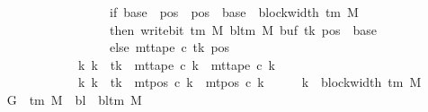 \begin{isabellebody}
\ \ \ \ \ \ \ \ \ \ \ \ \ \ \ \ \ \ \ \ if\ base\ {\isasymle}\ pos\ {\isasymand}\ pos\ {\isacharless}{\kern0pt}\ base\ {\isacharplus}{\kern0pt}\ {\isacharparenleft}{\kern0pt}block{\isacharunderscore}{\kern0pt}width\ {\isacharparenleft}{\kern0pt}{\isasymGamma}{\isacharunderscore}{\kern0pt}tm\ M{\isacharparenright}{\kern0pt}\ {\isacharminus}{\kern0pt}\ {}{\isacharparenright}{\kern0pt}\isanewline
\ \ \ \ \ \ \ \ \ \ \ \ \ \ \ \ \ \ \ \ then\ write{\isacharunderscore}{\kern0pt}bit\ {\isacharparenleft}{\kern0pt}{\isasymGamma}{\isacharunderscore}{\kern0pt}tm\ M{\isacharparenright}{\kern0pt}\ {\isacharparenleft}{\kern0pt}bl{\isacharunderscore}{\kern0pt}tm\ M{\isacharparenright}{\kern0pt}\ {\isacharparenleft}{\kern0pt}buf\ tk{\isacharparenright}{\kern0pt}\ {\isacharparenleft}{\kern0pt}pos\ {\isacharminus}{\kern0pt}\ base{\isacharparenright}{\kern0pt}\isanewline
\ \ \ \ \ \ \ \ \ \ \ \ \ \ \ \ \ \ \ \ else\ mt{\isacharunderscore}{\kern0pt}tape\ c{}\ tk\ pos{\isacharparenright}{\kern0pt}\isanewline
\ \ \ \ \ \ \ \ \ \ \ \ \ \ {\isasymand}\ {\isacharparenleft}{\kern0pt}{\isasymforall}k{\isacharprime}{\kern0pt}{\isachardot}{\kern0pt}\ k{\isacharprime}{\kern0pt}\ {\isasymnoteq}\ tk\ {\isasymlongrightarrow}\ mt{\isacharunderscore}{\kern0pt}tape\ c{\isacharprime}{\kern0pt}\ k{\isacharprime}{\kern0pt}\ {\isacharequal}{\kern0pt}\ mt{\isacharunderscore}{\kern0pt}tape\ c{}\ k{\isacharprime}{\kern0pt}{\isacharparenright}{\kern0pt}\isanewline
\ \ \ \ \ \ \ \ \ \ \ \ \ \ {\isasymand}\ {\isacharparenleft}{\kern0pt}{\isasymforall}k{\isacharprime}{\kern0pt}{\isachardot}{\kern0pt}\ k{\isacharprime}{\kern0pt}\ {\isasymnoteq}\ tk\ {\isasymlongrightarrow}\ mt{\isacharunderscore}{\kern0pt}pos\ c{\isacharprime}{\kern0pt}\ k{\isacharprime}{\kern0pt}\ {\isacharequal}{\kern0pt}\ mt{\isacharunderscore}{\kern0pt}pos\ c{}\ k{\isacharprime}{\kern0pt}{\isacharparenright}{\kern0pt}{\isachardoublequoteclose}\isanewline
%
\isadelimproof
%
\endisadelimproof
%
\isatagproof
{}\isamarkupfalse%
\ {\isacharminus}{\kern0pt}\isanewline
\ \ \isamarkupfalse%
\ {\isacharquery}{\kern0pt}k\ {\isacharequal}{\kern0pt}\ {\isachardoublequoteopen}block{\isacharunderscore}{\kern0pt}width\ {\isacharparenleft}{\kern0pt}{\isasymGamma}{\isacharunderscore}{\kern0pt}tm\ M{\isacharparenright}{\kern0pt}{\isachardoublequoteclose}\isanewline
\ \ \isamarkupfalse%
\ {\isacharquery}{\kern0pt}G\ {\isacharequal}{\kern0pt}\ {\isachardoublequoteopen}{\isasymGamma}{\isacharunderscore}{\kern0pt}tm\ M{\isachardoublequoteclose}\ \ {\isacharquery}{\kern0pt}bl\ {\isacharequal}{\kern0pt}\ {\isachardoublequoteopen}bl{\isacharunderscore}{\kern0pt}tm\ M{\isachardoublequoteclose}\isanewline

\end{isabellebody}
